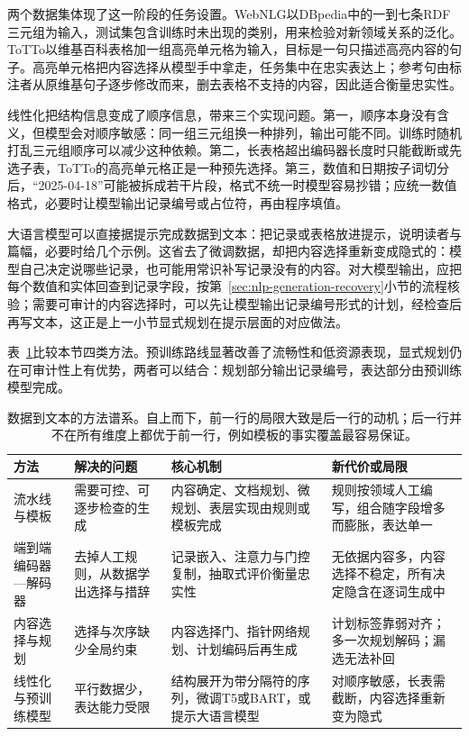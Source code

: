 两个数据集体现了这一阶段的任务设置。WebNLG以DBpedia中的一到七条RDF三元组为输入，测试集包含训练时未出现的类别，用来检验对新领域关系的泛化。ToTTo以维基百科表格加一组高亮单元格为输入，目标是一句只描述高亮内容的句子。高亮单元格把内容选择从模型手中拿走，任务集中在忠实表达上；参考句由标注者从原维基句子逐步修改而来，删去表格不支持的内容，因此适合衡量忠实性。

线性化把结构信息变成了顺序信息，带来三个实现问题。第一，顺序本身没有含义，但模型会对顺序敏感：同一组三元组换一种排列，输出可能不同。训练时随机打乱三元组顺序可以减少这种依赖。第二，长表格超出编码器长度时只能截断或先选子表，ToTTo的高亮单元格正是一种预先选择。第三，数值和日期按子词切分后，“2025-04-18”可能被拆成若干片段，格式不统一时模型容易抄错；应统一数值格式，必要时让模型输出记录编号或占位符，再由程序填值。

大语言模型可以直接据提示完成数据到文本：把记录或表格放进提示，说明读者与篇幅，必要时给几个示例。这省去了微调数据，却把内容选择重新变成隐式的：模型自己决定说哪些记录，也可能用常识补写记录没有的内容。对大模型输出，应把每个数值和实体回查到记录字段，按第~\ref{sec:nlp-generation-recovery}小节的流程核验；需要可审计的内容选择时，可以先让模型输出记录编号形式的计划，经检查后再写文本，这正是上一小节显式规划在提示层面的对应做法。

表~\ref{tab:nlp-generation-d2t-methods}比较本节四类方法。预训练路线显著改善了流畅性和低资源表现，显式规划仍在可审计性上有优势，两者可以结合：规划部分输出记录编号，表达部分由预训练模型完成。

\begin{table}[htbp]
  \centering
  \small
  \begin{tabularx}{\linewidth}{@{}>{\raggedright\arraybackslash}p{24mm}
    >{\raggedright\arraybackslash}X>{\raggedright\arraybackslash}X
    >{\raggedright\arraybackslash}X@{}}
    \toprule
    方法 & 解决的问题 & 核心机制 & 新代价或局限 \\
    \midrule
    流水线与模板 & 需要可控、可逐步检查的生成 & 内容确定、文档规划、微规划、表层实现由规则或模板完成 & 规则按领域人工编写，组合随字段增多而膨胀，表达单一 \\
    端到端编码器—解码器 & 去掉人工规则，从数据学出选择与措辞 & 记录嵌入、注意力与门控复制，抽取式评价衡量忠实性 & 无依据内容多，内容选择不稳定，所有决定隐含在逐词生成中 \\
    内容选择与规划 & 选择与次序缺少全局约束 & 内容选择门、指针网络规划、计划编码后再生成 & 计划标签靠弱对齐；多一次规划解码；漏选无法补回 \\
    线性化与预训练模型 & 平行数据少，表达能力受限 & 结构展开为带分隔符的序列，微调T5或BART，或提示大语言模型 & 对顺序敏感，长表需截断，内容选择重新变为隐式 \\
    \bottomrule
  \end{tabularx}
  \caption{数据到文本的方法谱系。自上而下，前一行的局限大致是后一行的动机；后一行并不在所有维度上都优于前一行，例如模板的事实覆盖最容易保证。}
  \label{tab:nlp-generation-d2t-methods}
\end{table}

